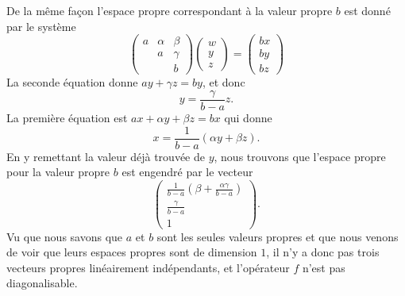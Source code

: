 \begin{remark}
    De la même façon l'espace propre correspondant à la valeur propre \( b\) est donné par le système
    \begin{equation}
        \begin{pmatrix}
            a    &   \alpha    &   \beta    \\
                &   a    &   \gamma    \\
                &       &   b
            \end{pmatrix}\begin{pmatrix}
                w    \\ 
                y    \\ 
                z    
            \end{pmatrix}=\begin{pmatrix}
                bx    \\ 
                by    \\ 
                bz    
            \end{pmatrix}
    \end{equation}
    La seconde équation donne \( ay+\gamma z=by\), et donc
    \begin{equation}
        y=\frac{ \gamma }{ b-a }z.
    \end{equation}
    La première équation est \( ax+\alpha y+\beta z=bx\) qui donne
    \begin{equation}
        x=\frac{1}{ b-a }(\alpha y+\beta z).
    \end{equation}
    En y remettant la valeur déjà trouvée de \( y\), nous trouvons que l'espace propre pour la valeur propre \( b\) est engendré par le vecteur
    \begin{equation}
        \begin{pmatrix}
            \frac{1}{ b-a }\left( \beta+\frac{ \alpha\gamma }{ b-a } \right)    \\
            \frac{ \gamma }{ b-a }    \\
            1
        \end{pmatrix}.
    \end{equation}
    Vu que nous savons que \( a\) et \( b\) sont les seules valeurs propres et que nous venons de voir que leurs espaces propres sont de dimension \( 1\), il n'y a donc pas trois vecteurs propres linéairement indépendants, et l'opérateur \( f\) n'est pas diagonalisable.


\end{remark}
